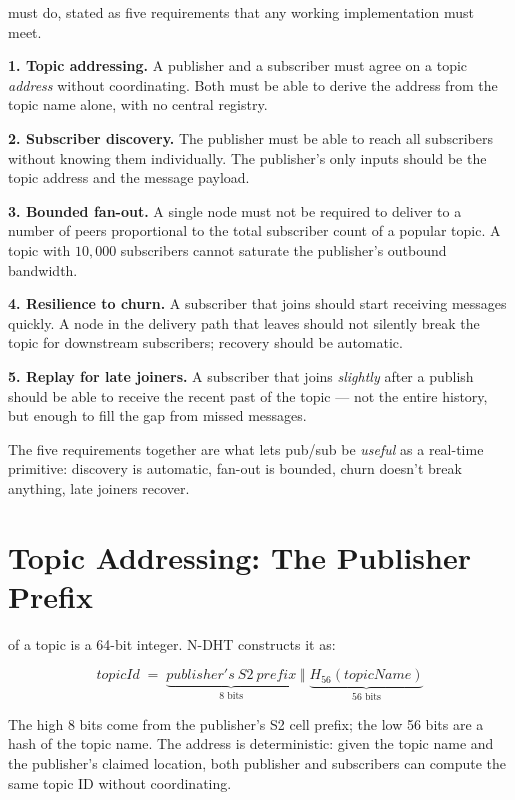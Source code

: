 \documentclass[twoside,nobib]{tufte-book}
\newcommand{\NDHT}{N-DHT\xspace}
\begin{document}
 must do, stated as five requirements
that any working implementation must meet.

\textbf{1. Topic addressing.} A publisher and a subscriber must
agree on a topic \emph{address} without coordinating. Both must
be able to derive the address from the topic name alone, with no
central registry.

\textbf{2. Subscriber discovery.} The publisher must be able to
reach all subscribers without knowing them individually. The
publisher's only inputs should be the topic address and the
message payload.

\textbf{3. Bounded fan-out.} A single node must not be required to
deliver to a number of peers proportional to the total subscriber
count of a popular topic. A topic with $10{,}000$ subscribers
cannot saturate the publisher's outbound bandwidth.

\textbf{4. Resilience to churn.} A subscriber that joins should
start receiving messages quickly. A node in the delivery path
that leaves should not silently break the topic for downstream
subscribers; recovery should be automatic.

\textbf{5. Replay for late joiners.} A subscriber that joins
\emph{slightly} after a publish should be able to receive the
recent past of the topic --- not the entire history, but enough
to fill the gap from missed messages.

The five requirements together are what lets pub/sub be
\emph{useful} as a real-time primitive: discovery is automatic,
fan-out is bounded, churn doesn't break anything, late joiners
recover.

\section{Topic Addressing: The Publisher Prefix}

 of a topic is a 64-bit integer. \NDHT
constructs it as:

\[
\mathit{topicId} \;=\;
\underbrace{\mathit{publisher's~S2~prefix}}_{\text{8 bits}}
\;\Vert\;
\underbrace{H_{56}(\mathit{topicName})}_{\text{56 bits}}
\]

The high 8 bits come from the publisher's S2 cell prefix; the low
56 bits are a hash of the topic name. The address is deterministic:
given the topic name and the publisher's claimed location, both
publisher and subscribers can compute the same topic ID without
coordinating.
\end{document}
